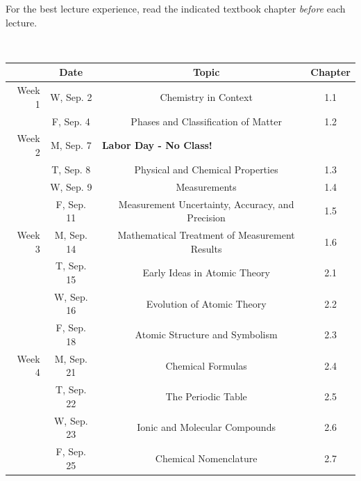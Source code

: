 \documentclass[12pt, letterpaper]{article}
\begin{document}
\noindent For the best lecture experience, read the indicated textbook chapter \emph{before} each lecture.

~
\noindent
\begin{tabular}{rcccc}
	       & Date       &                                                    & Topic                                            & Chapter \\
	\midrule
	Week 1 & W, Sep. 2  &                                                    & Chemistry in Context                             & 1.1     \\
	       & F, Sep. 4  &                                                    & Phases and Classification of Matter              & 1.2     \\
	\midrule
	Week 2 & M, Sep. 7  & \multicolumn{3}{l}{\textbf{Labor Day - No Class!}}                                                              \\
	       & T, Sep. 8  &                                                    & Physical and Chemical Properties                 & 1.3     \\
	       & W, Sep. 9  &                                                    & Measurements                                     & 1.4     \\
	       & F, Sep. 11 &                                                    & Measurement Uncertainty, Accuracy, and Precision & 1.5     \\
	\midrule
	Week 3 & M, Sep. 14 &                                                    & Mathematical Treatment of Measurement Results    & 1.6     \\
	       & T, Sep. 15 &                                                    & Early Ideas in Atomic Theory                     & 2.1     \\
	       & W, Sep. 16 &                                                    & Evolution of Atomic Theory                       & 2.2     \\
	       & F, Sep. 18 &                                                    & Atomic Structure and Symbolism                   & 2.3     \\
	\midrule
	Week 4 & M, Sep. 21 &                                                    & Chemical Formulas                                & 2.4     \\
	       & T, Sep. 22 &                                                    & The Periodic Table                               & 2.5     \\
	       & W, Sep. 23 &                                                    & Ionic and Molecular Compounds                    & 2.6     \\
	       & F, Sep. 25 &                                                    & Chemical Nomenclature                            & 2.7     \\
\end{tabular}
\end{document}
